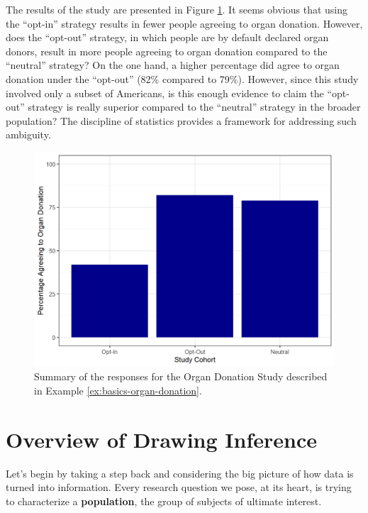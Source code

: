 \documentclass[
]{book}
\theoremstyle{plain}
\theoremstyle{mydefn}
\theoremstyle{myexmpl}
\theoremstyle{remark}
\begin{document}
The results of the study are presented in Figure \ref{fig:basics-organ-plot}. It seems obvious that using the ``opt-in'' strategy results in fewer people agreeing to organ donation. However, does the ``opt-out'' strategy, in which people are by default declared organ donors, result in more people agreeing to organ donation compared to the ``neutral'' strategy? On the one hand, a higher percentage did agree to organ donation under the ``opt-out'' (82\% compared to 79\%). However, since this study involved only a subset of Americans, is this enough evidence to claim the ``opt-out'' strategy is really superior compared to the ``neutral'' strategy in the broader population? The discipline of statistics provides a framework for addressing such ambiguity.



\begin{figure}

{\centering \includegraphics[width=0.8\linewidth]{./Images/basics-organ-plot-1} 

}

\caption{Summary of the responses for the Organ Donation Study described in Example \ref{ex:basics-organ-donation}.}\label{fig:basics-organ-plot}
\end{figure}

\hypertarget{overview-of-drawing-inference}{%
\section{Overview of Drawing Inference}\label{overview-of-drawing-inference}}

Let's begin by taking a step back and considering the big picture of how data is turned into information. Every research question we pose, at its heart, is trying to characterize a \textbf{population}, the group of subjects of ultimate interest.
\end{document}
